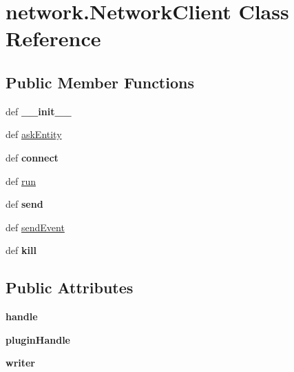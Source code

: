 \hypertarget{classnetwork_1_1_network_client}{\section{network.\-Network\-Client \-Class \-Reference}
\label{classnetwork_1_1_network_client}
}
\subsection*{\-Public \-Member \-Functions}
\begin{DoxyCompactItemize}
\item 
\hypertarget{classnetwork_1_1_network_client_aa5bab40f07dd948334f7bd830f4f339b}{def {\bfseries \-\_\-\-\_\-init\-\_\-\-\_\-}}\label{classnetwork_1_1_network_client_aa5bab40f07dd948334f7bd830f4f339b}

\item 
def \hyperlink{classnetwork_1_1_network_client_a29d178f68443ce03c823782ea22cd7d7}{ask\-Entity}
\item 
\hypertarget{classnetwork_1_1_network_client_a8d060b005fab9a729d718d7f7f4381d6}{def {\bfseries connect}}\label{classnetwork_1_1_network_client_a8d060b005fab9a729d718d7f7f4381d6}

\item 
def \hyperlink{classnetwork_1_1_network_client_a7b1b0ef4f3b4d442d6bcc32e5f3d12dc}{run}
\item 
\hypertarget{classnetwork_1_1_network_client_a8af20e1d3b4885f40000beb31ac85b97}{def {\bfseries send}}\label{classnetwork_1_1_network_client_a8af20e1d3b4885f40000beb31ac85b97}

\item 
def \hyperlink{classnetwork_1_1_network_client_ab24d2b88964be814761f3dcbe5b71278}{send\-Event}
\item 
\hypertarget{classnetwork_1_1_network_client_a8338a27c82d8f835ab20e7ffb3cbf3ac}{def {\bfseries kill}}\label{classnetwork_1_1_network_client_a8338a27c82d8f835ab20e7ffb3cbf3ac}

\end{DoxyCompactItemize}
\subsection*{\-Public \-Attributes}
\begin{DoxyCompactItemize}
\item 
\hypertarget{classnetwork_1_1_network_client_ae4e686f0130da5b8a732f1d6ecf76d97}{{\bfseries handle}}\label{classnetwork_1_1_network_client_ae4e686f0130da5b8a732f1d6ecf76d97}

\item 
\hypertarget{classnetwork_1_1_network_client_a308fb10211916ca1be6afbad9dd9ab04}{{\bfseries plugin\-Handle}}\label{classnetwork_1_1_network_client_a308fb10211916ca1be6afbad9dd9ab04}

\item 
\hypertarget{classnetwork_1_1_network_client_a729d020867282ebcd6dcd82d35b1bad3}{{\bfseries writer}}\label{classnetwork_1_1_network_client_a729d020867282ebcd6dcd82d35b1bad3}

\end{DoxyCompactItemize}


